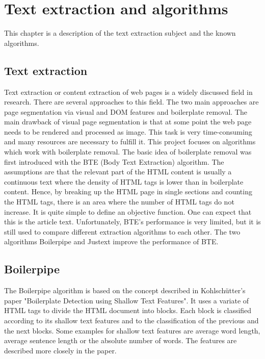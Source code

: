  \section{Text extraction and algorithms}

 This chapter is a description of the text extraction subject and the known algorithms.

 \subsection{Text extraction}

 Text extraction or content extraction of web pages is a widely discussed field in research. There are several approaches to this field. The two main approaches are page segmentation via visual and DOM features and boilerplate removal. The main drawback of visual page segmentation is that at some point the web page needs to be rendered and processed as image. This task is very time-consuming and many resources are necessary to fulfill it. This project focuses on algorithms which work with boilerplate removal.
 The basic idea of boilerplate removal was first introduced with the BTE (Body Text Extraction) algorithm. The assumptions are that the relevant part of the HTML content is usually a continuous text where the density of HTML tags is lower than in boilerplate content. Hence, by breaking up the HTML page in single sections and counting the HTML tags, there is an area where the number of HTML tags do not increase. It is quite simple to define an objective function. One can expect that this is the article text. Unfortunately, BTE's performance is very limited, but it is still used to compare different extraction algorithms to each other. The two algorithms Boilerpipe and Justext improve the performance of BTE.

 \subsection{Boilerpipe}

 The Boilerpipe algorithm is based on the concept described in Kohlschütter's paper "Boilerplate Detection using Shallow Text Features". It uses a variate of HTML tags  to divide the HTML document into blocks. Each block is classified according to its shallow text features and to the classification of the  previous and the next blocks. Some examples for shallow text features are average word length, average sentence length or the absolute number of words. The features are described more closely in the paper.

